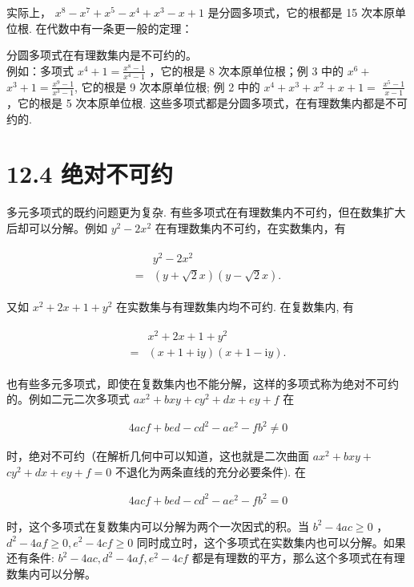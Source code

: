 \documentclass[10pt]{article}
\begin{document}
实际上， $x^{8}-x^{7}+x^{5}-x^{4}+x^{3}-x+1$ 是分圆多项式，它的根都是 15 次本原单位根. 在代数中有一条更一般的定理：

分圆多项式在有理数集内是不可约的。\\
例如：多项式 $x^{4}+1=\frac{x^{8}-1}{x^{4}-1}$ ，它的根是 8 次本原单位根；例 3 中的 $x^{6}+$ $x^{3}+1=\frac{x^{9}-1}{x^{3}-1}$, 它的根是 9 次本原单位根; 例 2 中的 $x^{4}+x^{3}+x^{2}+x+1=$ $\frac{x^{5}-1}{x-1}$ ，它的根是 5 次本原单位根. 这些多项式都是分圆多项式，在有理数集内都是不可约的.

\section*{12.4 绝对不可约}
多元多项式的既约问题更为复杂. 有些多项式在有理数集内不可约，但在数集扩大后却可以分解。例如 $y^{2}-2 x^{2}$ 在有理数集内不可约，在实数集内，有

\begin{align*}
\begin{aligned}
& y^{2}-2 x^{2} \\
= & (y+\sqrt{2} x)(y-\sqrt{2} x) .
\end{aligned}
\end{align*}

又如 $x^{2}+2 x+1+y^{2}$ 在实数集与有理数集内均不可约. 在复数集内, 有

\begin{align*}
\begin{aligned}
& x^{2}+2 x+1+y^{2} \\
= & (x+1+\mathrm{i} y)(x+1-\mathrm{i} y) .
\end{aligned}
\end{align*}

也有些多元多项式，即使在复数集内也不能分解，这样的多项式称为绝对不可约的。例如二元二次多项式 $a x^{2}+b x y+c y^{2}+d x+e y+f$ 在

\begin{align*}
4 a c f+b e d-c d^{2}-a e^{2}-f b^{2} \neq 0
\end{align*}

时，绝对不可约（在解析几何中可以知道，这也就是二次曲面 $a x^{2}+b x y+$ $c y^{2}+d x+e y+f=0$ 不退化为两条直线的充分必要条件). 在

\begin{align*}
4 a c f+b e d-c d^{2}-a e^{2}-f b^{2}=0 \tag{2}
\end{align*}

时，这个多项式在复数集内可以分解为两个一次因式的积。当 $b^{2}-4 a c \geqslant 0$ ， $d^{2}-4 a f \geqslant 0, e^{2}-4 c f \geqslant 0$ 同时成立时，这个多项式在实数集内也可以分解。如果还有条件: $b^{2}-4 a c, d^{2}-4 a f, e^{2}-4 c f$ 都是有理数的平方，那么这个多项式在有理数集内可以分解。
\end{document}
